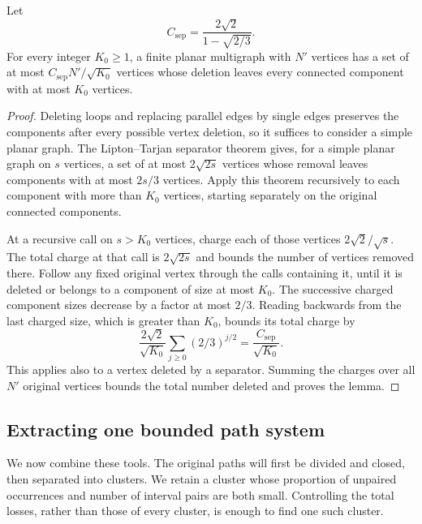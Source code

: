 \begin{lemma}
\label{lem:separator}
Let
\[
 C_{\mathrm{sep}}=\frac{2\sqrt2}{1-\sqrt{2/3}}.
\]
For every integer $K_0\ge1$, a finite planar multigraph with $N'$
vertices has a set of at most $C_{\mathrm{sep}}N'/\sqrt{K_0}$ vertices
whose deletion leaves every connected component with at most $K_0$
vertices.
\end{lemma}

\begin{proof}
Deleting loops and replacing parallel edges by single edges preserves
the components after every possible vertex deletion, so it suffices
to consider a simple planar graph.  The Lipton--Tarjan separator theorem
\cite{LiptonTarjan1979} gives, for a simple planar graph on $s$ vertices,
a set of at most $2\sqrt{2s}$ vertices whose removal leaves components
with at most $2s/3$ vertices.  Apply this theorem recursively to each
component with more than $K_0$ vertices, starting separately on the
original connected components.

At a recursive call on $s>K_0$ vertices, charge each of those vertices
$2\sqrt2/\sqrt{s}$.  The total charge at that call is $2\sqrt{2s}$ and
bounds the number of vertices removed there.  Follow any fixed original
vertex through the calls containing it, until it is deleted or belongs
to a component of size at most $K_0$.  The successive charged component
sizes decrease by a factor at most $2/3$.  Reading backwards from the
last charged size, which is greater than $K_0$, bounds its total charge
by
\[
 \frac{2\sqrt2}{\sqrt{K_0}}
 \sum_{j\ge0}(2/3)^{j/2}
 =\frac{C_{\mathrm{sep}}}{\sqrt{K_0}}.
\]
This applies also to a vertex deleted by a separator.  Summing the
charges over all $N'$ original vertices bounds the total number
deleted and proves the lemma.
\end{proof}

\subsection{Extracting one bounded path system}

We now combine these tools.  The original paths will first be divided
and closed, then separated into clusters.  We retain a cluster whose
proportion of unpaired occurrences and number of interval pairs are
both small.  Controlling the total losses, rather than those of every
cluster, is enough to find one such cluster.

